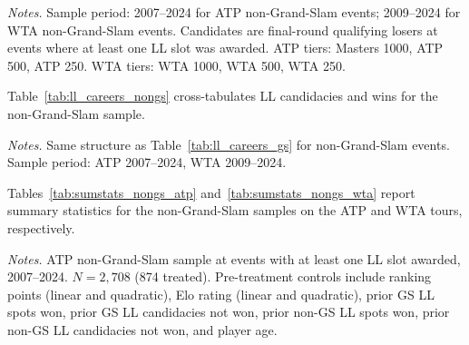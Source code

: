 \begin{table}[htbp]
\centering
\caption{Lucky Loser Distribution at Non-Grand-Slam Events}
\label{tab:ll_dist_nongs}
\begin{threeparttable}

\begin{tablenotes}
\footnotesize
\item \textit{Notes.} Sample period: 2007--2024 for ATP non-Grand-Slam events; 2009--2024 for WTA non-Grand-Slam events. Candidates are final-round qualifying losers at events where at least one LL slot was awarded. ATP tiers: Masters 1000, ATP 500, ATP 250. WTA tiers: WTA 1000, WTA 500, WTA 250.
\end{tablenotes}
\end{threeparttable}
\end{table}

Table~\ref{tab:ll_careers_nongs} cross-tabulates LL candidacies and wins for the non-Grand-Slam sample.

\begin{table}[htbp]
\centering
\caption{Player LL Candidacies and Wins: Non-Grand-Slam}
\label{tab:ll_careers_nongs}
\begin{threeparttable}
\small

\begin{tablenotes}
\footnotesize
\item \textit{Notes.} Same structure as Table~\ref{tab:ll_careers_gs} for non-Grand-Slam events. Sample period: ATP 2007--2024, WTA 2009--2024.
\end{tablenotes}
\end{threeparttable}
\end{table}

Tables~\ref{tab:sumstats_nongs_atp} and~\ref{tab:sumstats_nongs_wta} report summary statistics for the non-Grand-Slam samples on the ATP and WTA tours, respectively.

\begin{table}[htbp]
\centering
\caption{Summary Statistics: ATP Non-Grand-Slam Sample}
\label{tab:sumstats_nongs_atp}
\begin{threeparttable}
\small

\begin{tablenotes}
\footnotesize
\item \textit{Notes.} ATP non-Grand-Slam sample at events with at least one LL slot awarded, 2007--2024. $N = 2{,}708$ (874 treated). Pre-treatment controls include ranking points (linear and quadratic), Elo rating (linear and quadratic), prior GS LL spots won, prior GS LL candidacies not won, prior non-GS LL spots won, prior non-GS LL candidacies not won, and player age.
\end{tablenotes}
\end{threeparttable}
\end{table}


